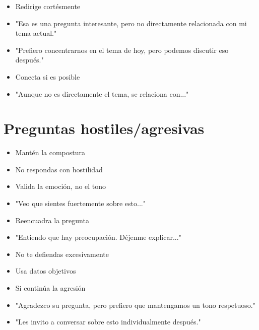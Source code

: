 \documentclass[a4paper,11pt]{article}
\begin{document}
\begin{itemize}

  \item Redirige cortésmente

  \item "Esa es una pregunta interesante, pero no directamente relacionada con mi tema actual."

  \item "Prefiero concentrarnos en el tema de hoy, pero podemos discutir eso después."

  \item Conecta si es posible

  \item "Aunque no es directamente el tema, se relaciona con..."

\end{itemize}

\vspace{0.2cm}

\section{Preguntas hostiles/agresivas}

\begin{itemize}

  \item Mantén la compostura

  \item No respondas con hostilidad

  \item Valida la emoción, no el tono

  \item "Veo que sientes fuertemente sobre esto..."

  \item Reencuadra la pregunta

  \item "Entiendo que hay preocupación. Déjenme explicar..."

  \item No te defiendas excesivamente

  \item Usa datos objetivos

  \item Si continúa la agresión

  \item "Agradezco su pregunta, pero prefiero que mantengamos un tono respetuoso."

  \item "Les invito a conversar sobre esto individualmente después."

\end{itemize}
\end{document}
